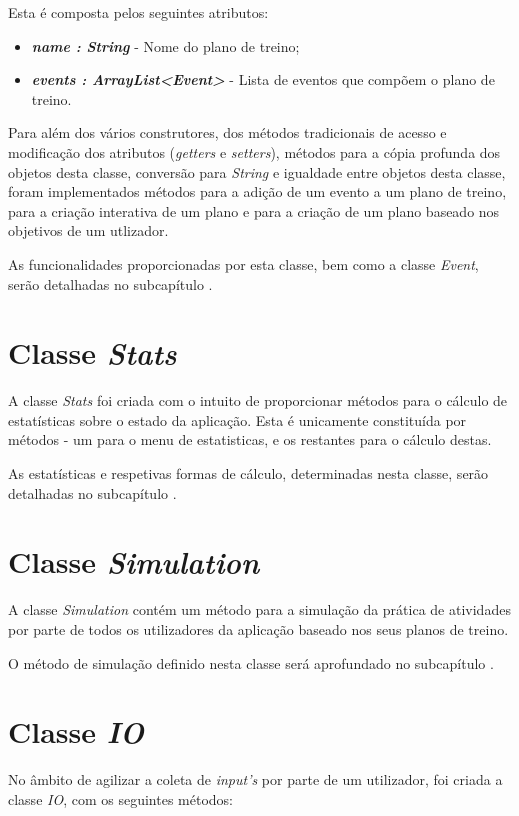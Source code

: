 \documentclass[a4paper,12pt]{scrreprt}
\begin{document}
    Esta é composta pelos seguintes atributos:
    \begin{itemize}
        \item \textit{\textbf{name : String}} - Nome do plano de treino;
        \item \textit{\textbf{events : ArrayList<Event>}} - Lista de eventos que compõem o plano de treino.
    \end{itemize}

    Para além dos vários construtores, dos métodos tradicionais de acesso e modificação dos atributos (\textit{getters} e \textit{setters}), métodos para a cópia profunda dos objetos desta classe, conversão para \textit{String} e
    igualdade entre objetos desta classe, foram implementados métodos para a adição de um evento a um plano de treino, para a criação interativa de um plano e para a criação de um plano baseado nos objetivos de um utlizador.

    As funcionalidades proporcionadas por esta classe, bem como a classe \textit{Event}, serão detalhadas no subcapítulo \textit{}.

\section{Classe \textit{Stats}}
    A classe \textit{Stats} foi criada com o intuito de proporcionar métodos para o cálculo de estatísticas sobre o estado da aplicação. Esta é unicamente constituída por métodos - um para o menu de estatisticas, e os restantes para o cálculo destas. 

    As estatísticas e respetivas formas de cálculo, determinadas nesta classe, serão detalhadas no subcapítulo \textit{}.

\section{Classe \textit{Simulation}}
    A classe \textit{Simulation} contém um método para a simulação da prática de atividades por parte de todos os utilizadores da aplicação baseado nos seus planos de treino.

    O método de simulação definido nesta classe será aprofundado no subcapítulo \textit{}.

\section{Classe \textit{IO}}
    No âmbito de agilizar a coleta de \textit{input's} por parte de um utilizador, foi criada a classe \textit{IO}, com os seguintes métodos:
\end{document}

